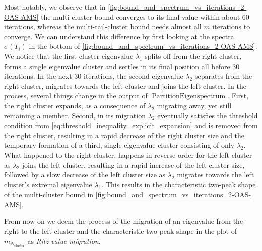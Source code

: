 Most notably, we observe that in \cref{fig:bound_and_spectrum_vs_iterations_2-OAS-AMS} the multi-cluster bound converges to its final value within about 60 iterations, whereas the multi-tail-cluster bound needs almost all $m$ iterations to converge. We can understand this difference by first looking at the spectra $\sigma(T_i)$ in the bottom of \cref{fig:bound_and_spectrum_vs_iterations_2-OAS-AMS}. We notice that the first cluster eigenvalue $\lambda_1$ splits off from the right cluster, forms a single eigenvalue cluster and settles in its final position all before 30 iterations. In the next 30 iterations, the second eigenvalue $\lambda_2$ separates from the right cluster, migrates towards the left cluster and joins the left cluster. In the process, several things change in the output of $\operatorname{PartitionEigenspectrum}$. First, the right cluster expands, as a consequence of $\lambda_2$ migrating away, yet still remaining a member. Second, in its migration $\lambda_2$ eventually satisfies the threshold condition from \cref{eq:threshold_inequality_explicit_expansion} and is removed from the right cluster, resulting in a rapid decrease of the right cluster size and the temporary formation of a third, single eigenvalue cluster consisting of only $\lambda_2$. What happened to the right cluster, happens in reverse order for the left cluster as $\lambda_2$ joins the left cluster, resulting in a rapid increase of the left cluster size, followed by a slow decrease of the left cluster size as $\lambda_2$ migrates towards the left cluster's extremal eigenvalue $\lambda_1$. This results in the characteristic two-peak shape of the multi-cluster bound in \cref{fig:bound_and_spectrum_vs_iterations_2-OAS-AMS}.

From now on we deem the process of the migration of an eigenvalue from the right to the left cluster and the characteristic two-peak shape in the plot of $m_{N_{\text{cluster}}}$ as \textit{Ritz value migration}. 

